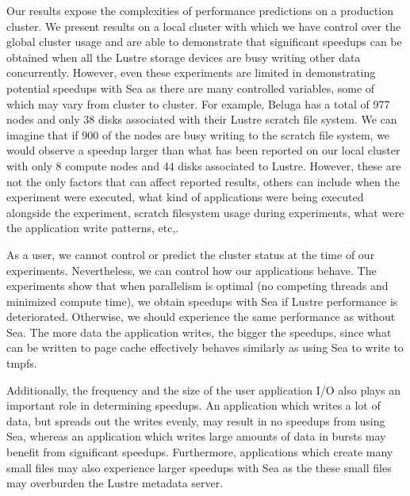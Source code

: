     Our results expose the complexities of performance predictions on a
    production cluster. We present results on a local cluster with which we have
    control over the global cluster usage and are able to demonstrate that
    significant speedups can be obtained when all the Lustre storage devices
    are busy writing other data concurrently. However, even these experiments
    are limited in demonstrating potential speedups with Sea as there are many
    controlled variables, some of which may vary from cluster to cluster. For
    example, Beluga has a total of 977 nodes and only 38 disks associated with
    their Lustre scratch file system. We can imagine that if 900 of the nodes
    are busy writing to the scratch file system, we would observe a speedup
    larger than what has been reported on our local cluster with only 8 compute
    nodes and 44 disks associated to Lustre. However, these are not the only
    factors that can affect reported results, others can include when the
    experiment were executed, what kind of applications were being executed
    alongside the experiment, scratch filesystem usage during experiments, what
    were the application write patterns, etc,.

    As a user, we cannot control or predict the cluster status at the time of
    our experiments. Nevertheless, we can control how our applications behave. The
    experiments show that when parallelism is optimal (no competing threads and
    minimized compute time), we obtain speedups with Sea if Lustre performance
    is deteriorated. Otherwise, we should experience the same performance as 
    without Sea. The more data the application writes, the bigger the speedups, since what
    can be written to page cache effectively behaves similarly as using Sea to write
    to tmpfs.
    
    Additionally, the frequency and the size of the user application I/O also
    plays an important role in determining speedups. An application which writes
    a lot of data, but spreads out the writes evenly, may result in no
    speedups from using Sea, whereas an application which writes large amounts
    of data in bursts may benefit from significant speedups. Furthermore,
    applications which create many small files may also experience larger
    speedups with Sea as the these small files may overburden the Lustre
    metadata server.

    
